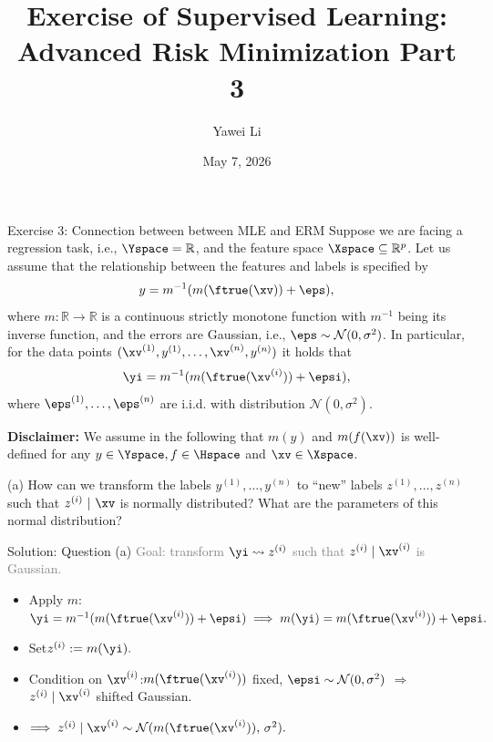 \documentclass[aspectratio=169]{beamer}
\title[]{\textbf{Exercise of Supervised Learning: \\ Advanced Risk Minimization Part 3}}
\author{Yawei Li}
\institute[LMU]
{
\\
  \texttt{yawei.li@stat.uni-muenchen.de}
}
\date{May 7, 2026}
\newcommand{\my}{m(y)}
\newcommand{\myi}{m(\yi)}
\newcommand{\mfx}{m(f(\xv))}
\newcommand{\zi}{z^{(i)}}
\newcommand{\mfruexi}{m(\ftrue(\xv^{(i)}))}
\begin{document}
\begin{frame}
\titlepage

\end{frame}


\begin{frame}{Exercise 3: Connection between between MLE and ERM}
\small
	Suppose we are facing a regression task, i.e., $\Yspace = \mathbb{R}$, and the feature space $\Xspace \subseteq \mathbb{R}^p$. Let us assume that the relationship between the features and labels is specified by 
	$$y = m^{-1}(m(\ftrue(\xv)) + \eps),$$
	where $m: \mathbb{R} \to \mathbb{R}$ is a continuous strictly monotone function with $m^{-1}$ being its inverse function, and the errors are Gaussian, i.e., $\eps \sim \mathcal{N}(0, \sigma^2)$. In particular, for the data points $(\xv^{(1)}, y^{(1)}, \ldots, \xv^{(n)}, y^{(n)})$ it holds that
	$$\yi = m^{-1}(m(\ftrue(\xv^{(i)})) + \epsi),$$
	where $\eps^{(1)}, \ldots, \eps^{(n)}$ are i.i.d. with distribution $\mathcal{N}(0, \sigma^2)$.
	
	\textbf{Disclaimer:} We assume in the following that $\my$ and $\mfx$ is well-defined for any $y \in \Yspace, f \in \Hspace$ and $\xv \in \Xspace$.
	
	(a) How can we transform the labels $y^{(1)}, \ldots, y^{(n)}$ to ``new'' labels $z^{(1)}, \ldots, z^{(n)}$ such that $ z^{(i)} \ | \ \xv$ is normally distributed? What are the parameters of this normal distribution?
	
\end{frame}

\begin{frame}{Solution: Question (a)}
\small
	\textcolor{gray}{\footnotesize Goal: transform $\yi \rightsquigarrow \zi$ such that $\zi \mid \xv^{(i)}$ is Gaussian.}
	\vspace{10pt}

	\begin{itemize}\setlength{\itemsep}{6pt}
		\item<1-> Apply $m$:\quad $\yi = m^{-1}(\mfruexi + \epsi) \;\Longrightarrow\; \myi = \mfruexi + \epsi.$
		\item<2-> Set\quad $\zi := \myi.$
		\item<3-> Condition on $\xv^{(i)}$:\quad $\mfruexi$ fixed,\; $\epsi \sim \mathcal{N}(0, \sigma^2)$\; $\Rightarrow$\; $\zi \mid \xv^{(i)}$ shifted Gaussian.
		\item<4-> $\Longrightarrow\; \zi \mid \xv^{(i)} \sim \mathcal{N}(\mfruexi,\, \sigma^2).$
	\end{itemize}
\end{frame}
\end{document}
